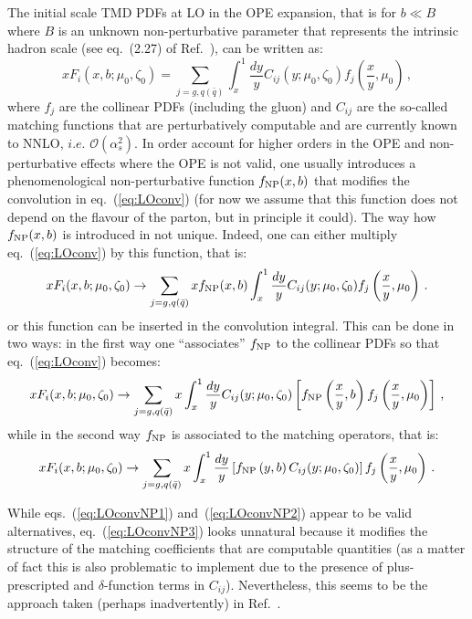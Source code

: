 \documentclass[10pt,a4paper]{article}
\begin{document}
The initial scale TMD PDFs at LO in the OPE expansion, that is for
$b\ll B$ where $B$ is an unknown non-perturbative parameter that
represents the intrinsic hadron scale (see eq.~(2.27) of
Ref.~\cite{Scimemi:2017etj}), can be written as:
\begin{equation}\label{eq:LOconv}
xF_i(x,b;\mu_0,\zeta_0) = \sum_{j=g,q(\bar{q})}\int_x^1\frac{dy}{y}C_{ij}(y;\mu_0,\zeta_0)f_j\left(\frac{x}{y},\mu_0\right)\,,
\end{equation}
where $f_j$ are the collinear PDFs (including the gluon) and $C_{ij}$
are the so-called matching functions that are perturbatively
computable and are currently known to NNLO, $i.e.$
$\mathcal{O}(\alpha_s^2)$. In order account for higher orders in the
OPE and non-perturbative effects where the OPE is not valid, one
usually introduces a phenomenological non-perturbative function
$f_{\rm NP}(x,b)$ that modifies the convolution in
eq.~(\ref{eq:LOconv}) (for now we assume that this function does not
depend on the flavour of the parton, but in principle it could). The
way how $f_{\rm NP}(x,b)$ is introduced in not unique. Indeed, one can
either multiply eq.~(\ref{eq:LOconv}) by this function, that is:
\begin{equation}\label{eq:LOconvNP1}
xF_i(x,b;\mu_0,\zeta_0) \rightarrow  \sum_{j=g,q(\bar{q})}xf_{\rm NP}(x,b)\int_x^1\frac{dy}{y}C_{ij}(y;\mu_0,\zeta_0)f_j\left(\frac{x}{y},\mu_0\right)\,.
\end{equation}
or this function can be inserted in the convolution integral. This can
be done in two ways: in the first way one ``associates'' $f_{\rm NP}$ to
the collinear PDFs so that eq.~(\ref{eq:LOconv}) becomes:
\begin{equation}\label{eq:LOconvNP2}
xF_i(x,b;\mu_0,\zeta_0) \rightarrow  \sum_{j=g,q(\bar{q})}x\int_x^1\frac{dy}{y}C_{ij}(y;\mu_0,\zeta_0) \left[f_{\rm NP}\left(\frac{x}{y},b\right) f_j\left(\frac{x}{y},\mu_0\right)\right]\,,
\end{equation}
while in the second way $f_{\rm NP}$ is associated to the matching
operators, that is:
\begin{equation}\label{eq:LOconvNP3}
xF_i(x,b;\mu_0,\zeta_0) \rightarrow
\sum_{j=g,q(\bar{q})}x\int_x^1\frac{dy}{y}\left[f_{\rm
    NP}\left(y,b\right) C_{ij}(y;\mu_0,\zeta_0)\right]  f_j\left(\frac{x}{y},\mu_0\right)\,.
\end{equation}

While eqs.~(\ref{eq:LOconvNP1}) and~(\ref{eq:LOconvNP2}) appear to be
valid alternatives, eq.~(\ref{eq:LOconvNP3}) looks unnatural because
it modifies the structure of the matching coefficients that are
computable quantities (as a matter of fact this is also problematic to
implement due to the presence of plus-prescripted and
$\delta$-function terms in $C_{ij}$). Nevertheless, this seems to be
the approach taken (perhaps inadvertently) in
Ref.~\cite{Scimemi:2017etj}.
\end{document}
